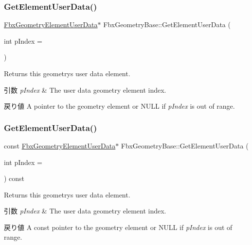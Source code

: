 \subsubsection{\texorpdfstring{Get\+Element\+User\+Data()}{GetElementUserData()}\hspace{0.1cm}{\footnotesize\ttfamily [1/2]}}
{\footnotesize\ttfamily \hyperlink{fbxlayer_8h_acef498b248e323a189b5ccbf478b0b41}{Fbx\+Geometry\+Element\+User\+Data}$\ast$ Fbx\+Geometry\+Base\+::\+Get\+Element\+User\+Data (\begin{DoxyParamCaption}\item[{int}]{p\+Index = {} }\end{DoxyParamCaption})}

Returns this geometry\textquotesingle{}s user data element. 
\begin{DoxyParams}{引数}
{\em p\+Index} & The user data geometry element index. \\
\hline
\end{DoxyParams}
\begin{DoxyReturn}{戻り値}
A pointer to the geometry element or {\ttfamily N\+U\+LL} if {\itshape p\+Index} is out of range. 
\end{DoxyReturn}
\mbox{\label{class_fbx_geometry_base_a40c905252aebb1ea71bd4d71a4c8704d}} 
\subsubsection{\texorpdfstring{Get\+Element\+User\+Data()}{GetElementUserData()}\hspace{0.1cm}{\footnotesize\ttfamily [2/2]}}
{\footnotesize\ttfamily const \hyperlink{fbxlayer_8h_acef498b248e323a189b5ccbf478b0b41}{Fbx\+Geometry\+Element\+User\+Data}$\ast$ Fbx\+Geometry\+Base\+::\+Get\+Element\+User\+Data (\begin{DoxyParamCaption}\item[{int}]{p\+Index = {} }\end{DoxyParamCaption}) const}

Returns this geometry\textquotesingle{}s user data element. 
\begin{DoxyParams}{引数}
{\em p\+Index} & The user data geometry element index. \\
\hline
\end{DoxyParams}
\begin{DoxyReturn}{戻り値}
A const pointer to the geometry element or {\ttfamily N\+U\+LL} if {\itshape p\+Index} is out of range. 
\end{DoxyReturn}
\mbox{\label{class_fbx_geometry_base_a8ea1964abcfde21f82d576ca07ac7f67}} 
